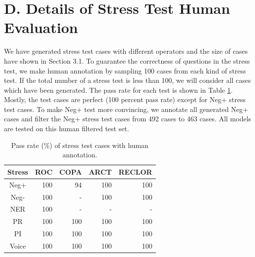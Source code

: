 \documentclass[runningheads]{llncs}
\newcommand{\tabref}[1]{Table \ref{#1}}
\begin{document}
\section{D.   Details of Stress Test Human Evaluation} 
We have generated stress test cases with different operators and 
the size of cases have shown in Section 3.1. 
To guarantee the correctness of questions in the stress test, we make 
human annotation by sampling 100 cases from each kind of stress test. 
If the total number of a stress test is less than 100, we will consider all  
cases which have been generated. 
The pass rate for each test is shown in \tabref{tab:pass_rate}. 
Mostly, the test cases are perfect (100 percent pass rate) except for Neg+ stress test cases. 
To make Neg+ test more convincing, we annotate all generated 
Neg+ cases and filter the Neg+ stress test cases from 492 cases to 463 cases. 
All models are tested on this human filtered test set. 
\begin{table}[th]
\centering
\scriptsize
\begin{tabular}{c|rrrr}
\toprule
\textbf{Stress} & \textbf{ROC} & \textbf{COPA} & \textbf{ARCT} & \textbf{RECLOR} \\ \midrule
Neg+  & 100&94&  100&100 \\ \hline
Neg-  & 100& -&  100&    100\\ \hline
NER  &  100&    -&  -&- \\ \hline
PR  &   100&100&100&100   \\ \hline
PI  &        100&   100&    100& 100\\  \hline
Voice  &    100&100   &100    &100    \\  \bottomrule
\end{tabular}
\caption{Pass rate (\%) of stress test cases with human annotation.}
\label{tab:pass_rate}
\end{table}
\end{document}
